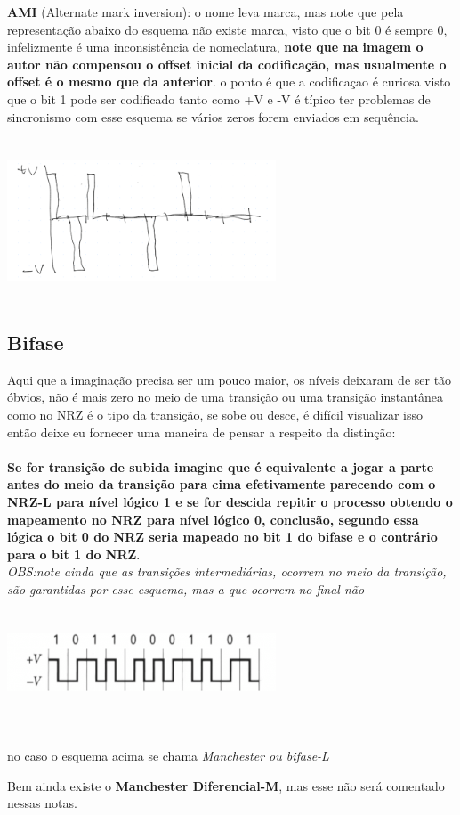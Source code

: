 \textbf{AMI} (Alternate mark inversion): o nome leva marca, mas note que pela representação abaixo do esquema não existe marca, visto que o bit 0 é sempre 0, infelizmente
é uma inconsistência de nomeclatura, \textbf{note que na imagem o autor não compensou o offset inicial da codificação, mas usualmente o offset é o mesmo que da anterior}.
o ponto é que a codificaçao é curiosa visto que o bit 1 pode ser codificado tanto como +V e -V é típico ter problemas de sincronismo com esse esquema se vários zeros
forem enviados em sequência.
\\
\\\\
\includegraphics[width=0.6\textwidth]{../assets/ami.png}\cite{dc}
\\\\

\subsection{Bifase}

Aqui que a imaginação precisa ser um pouco maior, os níveis deixaram de ser tão óbvios, não é mais zero no meio de uma transição ou uma transição instantânea como no NRZ
é o tipo da transição, se sobe ou desce, é difícil visualizar isso então deixe eu fornecer uma maneira de pensar a respeito da distinção:
\\
\\
\textbf{Se for transição de subida
	imagine que é equivalente a jogar a parte antes do meio da transição para cima efetivamente parecendo com o NRZ-L para nível lógico 1 e se for descida repitir o processo obtendo
	o mapeamento no NRZ para nível lógico 0, conclusão, segundo essa lógica o bit 0 do NRZ seria mapeado no bit 1 do bifase e o contrário para o bit 1 do NRZ}.
\\

\textit{OBS:note ainda que as transições intermediárias, ocorrem no meio da transição, são garantidas por esse esquema, mas a que ocorrem no final não}
\\
\\\\
\includegraphics[width=0.6\textwidth]{../assets/bifasel.png}\cite{dc}
\\\\
\\\\
no caso o esquema acima se chama \textit{Manchester ou bifase-L}

Bem ainda existe o \textbf{Manchester Diferencial-M}, mas esse não será comentado nessas notas.










